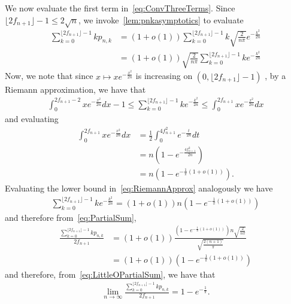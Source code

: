     We now evaluate the first term in~\cref{eq:ConvThreeTerms}. Since $\lfloor 2f_{n+1} \rfloor - 1 \le 2\sqrt{n}$, we invoke~\cref{lem:pnkasymptotics} to evaluate 
    \begin{align}
        \sum_{k=0}^{\lfloor 2f_{n+1} \rfloor-1} kp_{n,k} &=    (1+o(1))\sum_{k=0}^{\lfloor 2f_{n+1} \rfloor-1} k \sqrt{\frac{2}{n\pi}} e^{-\frac{k^2}{2n}} \\
        &= (1+o(1)) \sqrt{\frac{2}{n\pi}} \sum_{k=0}^{\lfloor 2f_{n+1} \rfloor-1} k e^{-\frac{k^2}{2n}} \label{eq:PartialSum}
    \end{align}
    Now, we note that since $x \mapsto xe^{-\frac{x^2}{2n}}$ is increasing on $(0,\lfloor 2f_{n+1} \rfloor-1)$ %
    , by a Riemann approximation, we have that 
    \begin{align} \label{eq:RiemannApprox}
    \int_{0}^{2f_{n+1}-2} x e^{-\frac{x^2}{2n}} dx - 1 \le\sum_{k=0}^{\lfloor 2f_{n+1} \rfloor-1} k e^{-\frac{k^2}{2n}} \le \int_{0}^{2f_{n+1}} x e^{-\frac{x^2}{2n}} dx 
    \end{align}
    and evaluating
    \begin{align}
        \int_{0}^{2f_{n+1}} x e^{-\frac{x^2}{2n}} dx &= \frac{1}{2} \int_{0}^{4f_{n+1}^2} e^{-\frac{t}{2n}} dt \nonumber\\
        &= n\left(1-e^{-\frac{4f_{n+1}^2}{2n}}\right) \nonumber\\
        &= n\left(1-e^{-\frac{1}{\pi}(1+o(1))}\right).
    \end{align}
    Evaluating the lower bound in~\cref{eq:RiemannApprox} analogously we have 
    \begin{align}\label{eq:ExptZCLowRegime}
        \sum_{k=0}^{\lfloor 2f_{n+1} \rfloor-1} k e^{-\frac{k^2}{2n}} = (1+o(1)) n\left(1-e^{-\frac{1}{\pi}(1+o(1))}\right)
    \end{align}
    and therefore from~\cref{eq:PartialSum}, 
    \begin{align}
        \frac{\sum_{k=0}^{\lfloor 2f_{n+1} \rfloor-1} k p_{n,k}}{2f_{n+1}} &= (1+o(1))\frac{\left(1-e^{-\frac{1}{\pi}(1+o(1))}\right) n \sqrt{\frac{2}{n \pi}}}{\sqrt{\frac{2(n+1)}{\pi}}} \nonumber\\
      &= (1+o(1))\left(1-e^{-\frac{1}{\pi}(1+o(1))}\right) \label{eq:LittleOPartialSum}
    \end{align}
    and therefore, from~\cref{eq:LittleOPartialSum}, we have that 
    \begin{align}\label{eq:LimFirstTermConverse}
        \lim_{n \to \infty}  \frac{\sum_{k=0}^{\lfloor 2f_{n+1} \rfloor-1} k p_{n,k}}{2f_{n+1}}  = 1-e^{-\frac{1}{\pi}}.
    \end{align}
